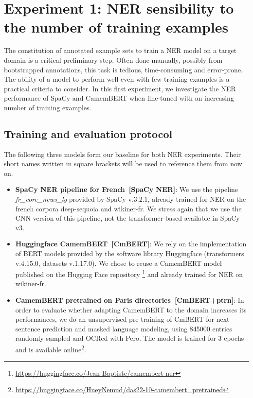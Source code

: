 \section{Experiment 1: NER sensibility to the number of training examples}
\label{sec:ner-xp1}
The constitution of annotated example sets to train a NER model on a target domain is a critical preliminary step.
Often done manually, possibly from bootstrapped annotations, this task is tedious, time-consuming and error-prone.
The ability of a model to perform well even with few training examples is a practical criteria to consider.
In this first experiment, we investigate the NER performance of SpaCy and CamemBERT when fine-tuned with an increasing number of training examples.

\subsection{Training and evaluation protocol}
\label{sec:ner-xp1-protocol}
The following three models form our baseline for both NER experiments.
Their short names written in square brackets will be used to reference them from now on.
\begin{itemize}
    \item \textbf{SpaCy NER pipeline for French~[SpaCy NER]}: We use the pipeline \textit{fr\_core\_news\_lg} provided by SpaCy v.3.2.1, already trained for NER on the french corpora deep-sequoia and wikiner-fr.
    We stress again that we use the CNN version of this pipeline, not the transformer-based available in SpaCy v3.
    \item \textbf{Huggingface CamemBERT~[CmBERT]}: We rely on the implementation of BERT models provided by the software library Huggingface (transformers v.4.15.0, datasets v.1.17.0).
We chose to reuse a CamemBERT model published on the Hugging Face repository \footnote{\url{https://huggingface.co/Jean-Baptiste/camembert-ner}} and already trained for NER on wikiner-fr.
\item \textbf{CamemBERT pretrained on Paris directories~[CmBERT+ptrn]}: 
In order to evaluate whether adapting CamemBERT to the domain increases its performances, we do an unsupervised pre-training of CmBERT for next sentence prediction and masked language modeling, using \num{845000} entries randomly sampled and OCRed with Pero.
The model is trained for 3 epochs and is available online\footnote{\url{https://huggingface.co/HueyNemud/das22-10-camembert_pretrained}}.
\end{itemize}

